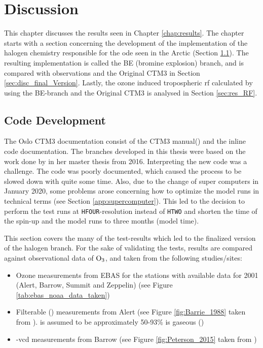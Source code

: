 \setcounter{chapter}{6}
\chapter{Discussion}\label{chap:discussion}

This chapter discusses the results seen in Chapter \ref{chap:results}. The chapter starts with a section concerning the development of the implementation of the halogen chemistry responsible for the \acrfull{ode} seen in the Arctic (Section \ref{sec:discussion_code_development}). The resulting implementation is called the BE (bromine explosion) branch, and is compared with observations and the Original CTM3 in Section \ref{sec:disc_final_Version}. Lastly, the ozone induced tropospheric \acrfull{rf} calculated by using the BE-branch and the Original CTM3 is analysed in Section \ref{sec:res_RF}.


\section{Code Development}\label{sec:discussion_code_development}

The Oslo CTM3 documentation consist of the CTM3 manual(\cite{SovdeManual}) and the inline code documentation. The branches developed in this thesis were based on the work done by \cite{Susanne} in her master thesis from 2016. Interpreting the new code was a challenge. The code was poorly documented, which caused the process to be slowed down with quite some time. Also, due to the change of super computers in January 2020, some problems arose concerning how to optimize the model runs in technical terms (see Section \ref{app:supercomputer}). This led to the decision to perform the test runs at \texttt{HFOUR}-resolution instead of \texttt{HTWO} and shorten the time of the spin-up and the model runs to three months (model time). 

\medskip

This section covers the many of the test-results which led to the finalized version of the halogen branch. For the sake of validating the tests, results are compared against observational data of $\mathrm{O_3}$,  and  taken from the following studies/sites: 

\begin{itemize}
    \item Ozone measurements from EBAS for the stations with available data for 2001 (Alert, Barrow, Summit and Zeppelin) (see Figure \ref{tab:ebas_noaa_data_taken})
    \item Filterable  () measurements from Alert (see Figure \ref{fig:Barrie_1988} taken from \cite{barrie}).  is assumed to be approximately 50-93\% is gaseous  (\cite{barrie})
    \item {}-\acrfull{vcd} measurements from Barrow (see Figure \ref{fig:Peterson_2015} taken from \cite{Peterson2015})
\end{itemize}

